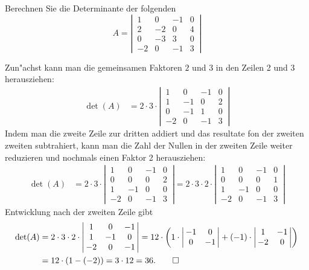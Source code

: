 Berechnen Sie die Determinante der folgenden
\[
A=\left|\,\begin{matrix}
 1& 0&-1&0\\
 2&-2& 0&4\\
 0&-3& 3&0\\
-2& 0&-1&3
\end{matrix}\,\right|
\]

\begin{loesung}
Zun"achst kann man die gemeinsamen Faktoren $2$ und $3$ in den Zeilen 2 und 3
herausziehen:
\begin{align*}
\det(A)
&=
2\cdot 3\cdot
\left|\,\begin{matrix}
 1& 0&-1&0\\
 1&-1& 0&2\\
 0&-1& 1&0\\
-2& 0&-1&3
\end{matrix}\,\right|
\end{align*}
Indem man die zweite Zeile zur dritten addiert und das resultate fon der zweiten
zweiten subtrahiert,
kann man die Zahl der Nullen in der zweiten Zeile weiter reduzieren und
nochmals einen Faktor 2 herausziehen:
\begin{align*}
\det(A)
&=
2\cdot 3\cdot
\left|\,\begin{matrix}
 1& 0&-1&0\\
 0& 0& 0&2\\
 1&-1& 0&0\\
-2& 0&-1&3
\end{matrix}\,\right|
=
2\cdot 3\cdot2\cdot
\left|\,\begin{matrix}
 1& 0&-1&0\\
 0& 0& 0&1\\
 1&-1& 0&0\\
-2& 0&-1&3
\end{matrix}\,\right|
\end{align*}
Entwicklung nach der zweiten Zeile gibt
\begin{align*}
\det(A)
&=
2\cdot 3\cdot2\cdot
\left|\,\begin{matrix}
 1& 0&-1\\
 1&-1& 0\\
-2& 0&-1
\end{matrix}\,\right|
=
12\cdot \biggl(
1\cdot
\left|\,\begin{matrix}-1& 0\\ 0&-1\end{matrix}\,\right|
+
(-1)\cdot
\left|\,\begin{matrix} 1&-1\\-2& 0\end{matrix}\,\right|
\biggr)
\\
&=12\cdot(1-(-2))=3\cdot 12=36.
\qedhere
\end{align*}


\end{loesung}
